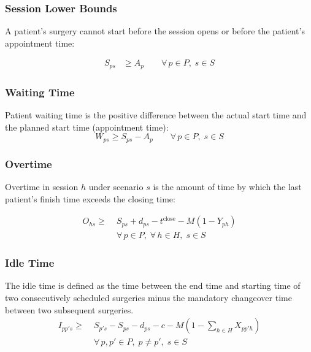 \subsubsection{Session Lower Bounds}

A patient's surgery cannot start before the session opens or before the
patient's appointment time:

%
\begin{align}
  S_{ps} &\geq A_p
  \qquad \forall\, p \in P,\; s \in S
  \label{eq:lb_appt}
\end{align}


\subsubsection{Waiting Time}

Patient waiting time is the positive difference between the actual start time and the planned start time (appointment time):
%
\begin{equation}
  W_{ps} \geq S_{ps} - A_p
  \qquad \forall\, p \in P,\; s \in S
  \label{eq:wait}
\end{equation}

\subsubsection{Overtime}

Overtime in session $h$ under scenario $s$ is the amount of time by which the last
patient's finish time exceeds the closing time:
%

\begin{align}
  O_{hs} \geq\; &
                    S_{ps} + d_{ps}
                  - t^{\text{close}}-M(1- Y_{ph}) \nonumber \\
                & \forall\, p \in P,\;\forall\, h \in H,\; s \in S
  \label{eq:overtime}
\end{align}

\subsubsection{Idle Time}

The idle time is defined as the time between the end time and starting time of two consecutively scheduled surgeries minus the mandatory changeover time between two subsequent surgeries.
%
\begin{align}
  I_{pp's} \geq\; & S_{p's}-S_{ps}-d_{ps}-
                  c-M\left(1-\sum_{h \in H}X_{pp'h}\right) \nonumber \\
                & \forall\, p, p' \in P,\; p \neq p',\; s \in S
  \label{eq:idle}
\end{align}
